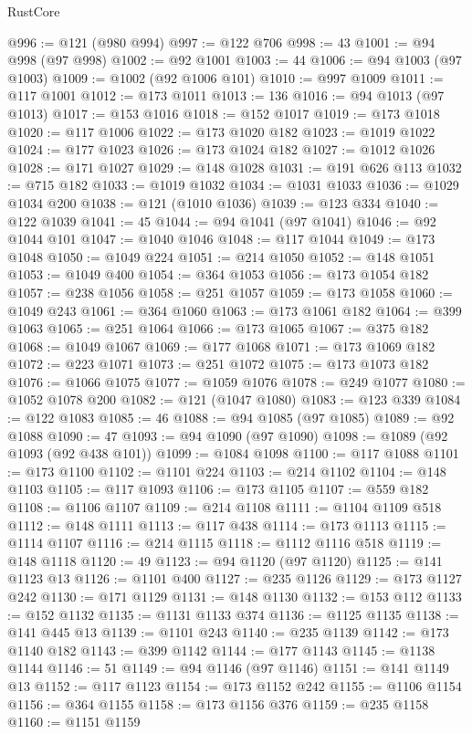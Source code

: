 \begin{lexlean}{RustCore}
\begin{coremodule}
@996 := @121 (@980 @994)
@997 := @122 @706
@998 := 43
@1001 := @94 @998 (@97 @998)
@1002 := @92 @1001
@1003 := 44
@1006 := @94 @1003 (@97 @1003)
@1009 := @1002 (@92 @1006 @101)
@1010 := @997 @1009
@1011 := @117 @1001
@1012 := @173 @1011
@1013 := 136
@1016 := @94 @1013 (@97 @1013)
@1017 := @153 @1016
@1018 := @152 @1017
@1019 := @173 @1018
@1020 := @117 @1006
@1022 := @173 @1020 @182
@1023 := @1019 @1022
@1024 := @177 @1023
@1026 := @173 @1024 @182
@1027 := @1012 @1026
@1028 := @171 @1027
@1029 := @148 @1028
@1031 := @191 @626 @113
@1032 := @715 @182
@1033 := @1019 @1032
@1034 := @1031 @1033
@1036 := @1029 @1034 @200
@1038 := @121 (@1010 @1036)
@1039 := @123 @334
@1040 := @122 @1039
@1041 := 45
@1044 := @94 @1041 (@97 @1041)
@1046 := @92 @1044 @101
@1047 := @1040 @1046
@1048 := @117 @1044
@1049 := @173 @1048
@1050 := @1049 @224
@1051 := @214 @1050
@1052 := @148 @1051
@1053 := @1049 @400
@1054 := @364 @1053
@1056 := @173 @1054 @182
@1057 := @238 @1056
@1058 := @251 @1057
@1059 := @173 @1058
@1060 := @1049 @243
@1061 := @364 @1060
@1063 := @173 @1061 @182
@1064 := @399 @1063
@1065 := @251 @1064
@1066 := @173 @1065
@1067 := @375 @182
@1068 := @1049 @1067
@1069 := @177 @1068
@1071 := @173 @1069 @182
@1072 := @223 @1071
@1073 := @251 @1072
@1075 := @173 @1073 @182
@1076 := @1066 @1075
@1077 := @1059 @1076
@1078 := @249 @1077
@1080 := @1052 @1078 @200
@1082 := @121 (@1047 @1080)
@1083 := @123 @339
@1084 := @122 @1083
@1085 := 46
@1088 := @94 @1085 (@97 @1085)
@1089 := @92 @1088
@1090 := 47
@1093 := @94 @1090 (@97 @1090)
@1098 := @1089 (@92 @1093 (@92 @438 @101))
@1099 := @1084 @1098
@1100 := @117 @1088
@1101 := @173 @1100
@1102 := @1101 @224
@1103 := @214 @1102
@1104 := @148 @1103
@1105 := @117 @1093
@1106 := @173 @1105
@1107 := @559 @182
@1108 := @1106 @1107
@1109 := @214 @1108
@1111 := @1104 @1109 @518
@1112 := @148 @1111
@1113 := @117 @438
@1114 := @173 @1113
@1115 := @1114 @1107
@1116 := @214 @1115
@1118 := @1112 @1116 @518
@1119 := @148 @1118
@1120 := 49
@1123 := @94 @1120 (@97 @1120)
@1125 := @141 @1123 @13
@1126 := @1101 @400
@1127 := @235 @1126
@1129 := @173 @1127 @242
@1130 := @171 @1129
@1131 := @148 @1130
@1132 := @153 @112
@1133 := @152 @1132
@1135 := @1131 @1133 @374
@1136 := @1125 @1135
@1138 := @141 @445 @13
@1139 := @1101 @243
@1140 := @235 @1139
@1142 := @173 @1140 @182
@1143 := @399 @1142
@1144 := @177 @1143
@1145 := @1138 @1144
@1146 := 51
@1149 := @94 @1146 (@97 @1146)
@1151 := @141 @1149 @13
@1152 := @117 @1123
@1154 := @173 @1152 @242
@1155 := @1106 @1154
@1156 := @364 @1155
@1158 := @173 @1156 @376
@1159 := @235 @1158
@1160 := @1151 @1159

\end{coremodule}
\end{lexlean}
